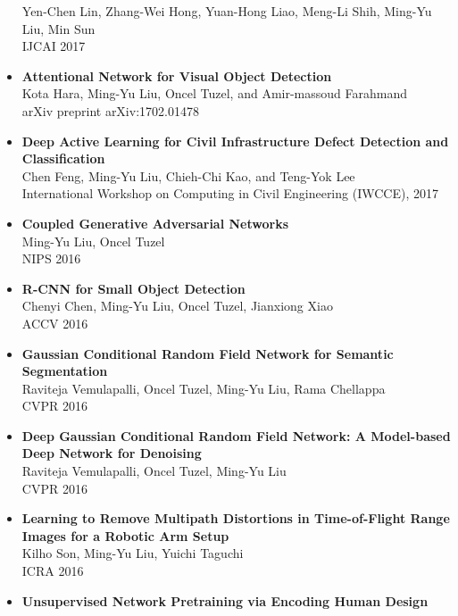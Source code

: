 \begin{itemize}
      Yen-Chen Lin, Zhang-Wei Hong, Yuan-Hong Liao, Meng-Li Shih, Ming-Yu Liu, Min Sun\\
      IJCAI 2017\vspace{-2mm}      
\item {\bf Attentional Network for Visual Object Detection}\\
      Kota Hara, Ming-Yu Liu, Oncel Tuzel, and Amir-massoud Farahmand\\
      arXiv preprint arXiv:1702.01478\vspace{-2mm}
\item {\bf Deep Active Learning for Civil Infrastructure Defect Detection and Classification}\\
      Chen Feng, Ming-Yu Liu, Chieh-Chi Kao, and Teng-Yok Lee\\
      International Workshop on Computing in Civil Engineering (IWCCE), 2017\vspace{-2mm}
\item {\bf Coupled Generative Adversarial Networks}\\
      Ming-Yu Liu, Oncel Tuzel\\
      NIPS 2016\vspace{-2mm}
\item {\bf R-CNN for Small Object Detection}\\
      Chenyi Chen, Ming-Yu Liu, Oncel Tuzel, Jianxiong Xiao\\
      ACCV 2016\vspace{-2mm}      
\item {\bf Gaussian Conditional Random Field Network for Semantic Segmentation}\\
      Raviteja Vemulapalli, Oncel Tuzel, Ming-Yu Liu, Rama Chellappa\\
      CVPR 2016\vspace{-2mm}
\item {\bf Deep Gaussian Conditional Random Field Network: A Model-based Deep Network for Denoising}\\
      Raviteja Vemulapalli, Oncel Tuzel, Ming-Yu Liu\\ CVPR 2016\vspace{-2mm}
\item {\bf Learning to Remove Multipath Distortions in Time-of-Flight Range Images for a Robotic Arm Setup}\\
      Kilho Son, Ming-Yu Liu, Yuichi Taguchi\\
       ICRA 2016\vspace{-2mm}
\item {\bf Unsupervised Network Pretraining via Encoding Human Design}\\

\end{itemize}
